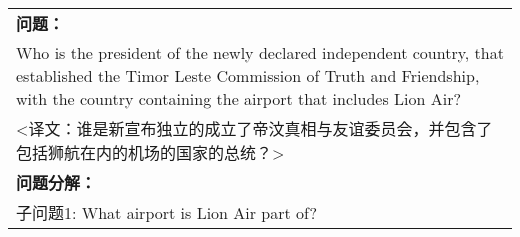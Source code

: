 \begin{table}[htbp]
\begin{tabular}{p{420pt}}
    \hline
    {\bfseries 问题：} \\
    Who is the president of the newly declared independent country, that established the Timor Leste Commission of Truth and Friendship, with the country containing the airport that includes Lion Air? \\
    <译文：谁是新宣布独立的成立了帝汶真相与友谊委员会，并包含了包括狮航在内的机场的国家的总统？> \\
    \hline
    {\bfseries 问题分解：} \\
    子问题1: What airport is Lion Air part of? \\

\end{tabular}
\end{table}
